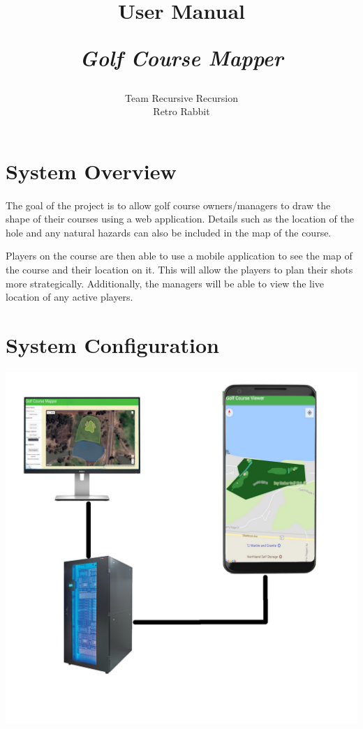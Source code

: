 \documentclass{article}
\title{
    User Manual\\
    \begin{large}
        \textit{Golf Course Mapper}
    \end{large}
}
\date{
    \begin{small}
        \today
    \end{small}
}
\author{
    Team Recursive Recursion \\
    Retro Rabbit
}
\begin{document}
    \maketitle
    \newpage


    
    \tableofcontents
    \newpage
	\section{System Overview}    
	\paragraph{}
	The goal of the project is to allow golf course owners/managers to draw the shape of their
courses using a web application. Details such as the location of the hole and any natural
hazards can also be included in the map of the course.

Players on the course are then able to use a mobile application to see the map of the
course and their location on it. This will allow the players to plan their shots more
strategically. Additionally, the managers will be able to view the live location of any
active players.


	\section{System Configuration}
	 \includegraphics[scale=0.25]{sys-conf-diagram.jpg}
\end{document}
